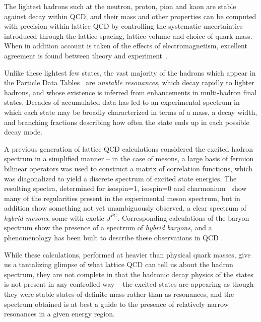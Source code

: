 The lightest hadrons such at the neutron, proton, pion and kaon are stable against decay within QCD, and their mass and other properties can be computed with precision within lattice QCD by controlling the systematic uncertainties introduced through the lattice spacing, lattice volume and choice of quark mass. When in addition account is taken of the effects of electromagnetism, excellent agreement is found between theory and experiment~\cite{Duncan:1996xy, Blum:2007cy, Borsanyi:2014jba, Horsley:2015eaa, Blum:2010ym, Aoki:2012st, deDivitiis:2013xla}. %

Unlike these lightest few states, the vast majority of the hadrons which appear in the Particle Data Tables~\cite{Patrignani:2016xqp} are \emph{unstable resonances}, which decay rapidly to lighter hadrons, and whose existence is inferred from enhancements in multi-hadron final states. Decades of accumulated data has led to an experimental spectrum in which each state may be broadly characterized in terms of a mass, a decay width, and branching fractions describing how often the state ends up in each possible decay mode. 

A previous generation of lattice QCD calculations considered the excited hadron spectrum in a simplified manner -- in the case of mesons, a large basis of fermion bilinear operators was used to construct a matrix of correlation functions, which was diagonalized to yield a discrete spectrum of excited state energies. The resulting spectra, determined for isospin=1, isospin=0 and charmonium~\cite{Dudek:2010wm,Dudek:2013yja, Liu:2012ze} show many of the regularities present in the experimental meson spectrum, but in addition show something not yet unambiguously observed, a clear spectrum of \emph{hybrid mesons}, some with exotic $J^{PC}$. Corresponding calculations of the baryon spectrum \cite{Dudek:2012ag} show the presence of a spectrum of \emph{hybrid baryons}, and a phenomenology has been built to describe these observations in QCD \cite{Dudek:2011bn}. 

While these calculations, performed at heavier than physical quark masses, give us a tantalizing glimpse of what lattice QCD can tell us about the hadron spectrum, they are not complete in that the hadronic decay physics of the states is not present in any controlled way -- the excited states are appearing as though they were stable states of definite mass rather than as resonances, and the spectrum obtained is at best a guide to the presence of relatively narrow resonances in a given energy region.

